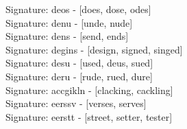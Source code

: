 Signature: {deos} - [does, dose, odes] \\
Signature: {denu} - [unde, nude] \\
Signature: {dens} - [send, ends] \\
Signature: {degins} - [design, signed, singed] \\
Signature: {desu} - [used, deus, sued] \\
Signature: {deru} - [rude, rued, dure] \\
Signature: {accgikln} - [clacking, cackling] \\
Signature: {eerssv} - [verses, serves] \\
Signature: {eerstt} - [street, setter, tester] \\
